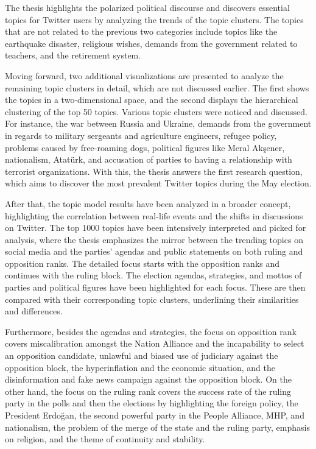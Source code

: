 The thesis highlights the polarized political discourse and discovers essential topics for Twitter 
users by analyzing the trends of the topic clusters. The topics that are not related to the previous 
two categories include topics like the earthquake disaster, religious wishes, demands from the 
government related to teachers, and the retirement system.

Moving forward, two additional visualizations are presented to analyze the remaining topic clusters 
in detail, which are not discussed earlier. The first shows the topics in a two-dimensional space, 
and the second displays the hierarchical clustering of the top 50 topics. Various topic clusters were 
noticed and discussed. For instance, the war between Russia and Ukraine, demands from the government 
in regards to military sergeants and agriculture engineers, refugee policy, problems caused by 
free-roaming dogs, political figures like Meral Akşener, nationalism, Atatürk, and accusation of 
parties to having a relationship with terrorist organizations. With this, the thesis answers the first 
research question, which aims to discover the most prevalent Twitter topics during the May election.

After that, the topic model results have been analyzed in a broader concept, highlighting the 
correlation between real-life events and the shifts in discussions on Twitter. The top 1000 topics 
have been intensively interpreted and picked for analysis, where the thesis emphasizes the mirror 
between the trending topics on social media and the parties' agendas and public statements on both 
ruling and opposition ranks. The detailed focus starts with the opposition ranks and continues with 
the ruling block. The election agendas, strategies, and mottos of parties and political figures have 
been highlighted for each focus. These are then compared with their corresponding topic clusters, 
underlining their similarities and differences. 

Furthermore, besides the agendas and strategies, the focus on opposition rank covers miscalibration 
amongst the Nation Alliance and the incapability to select an opposition candidate, unlawful and 
biased use of judiciary against the opposition block, the hyperinflation and the economic situation, 
and the disinformation and fake news campaign against the opposition block. On the other hand, the 
focus on the ruling rank covers the success rate of the ruling party in the polls and then the 
elections by highlighting the foreign policy, the President Erdoğan, the second powerful party in 
the People Alliance, \ac{MHP}, and nationalism,  the problem of the merge of the state and the ruling 
party, emphasis on religion, and the theme of continuity and stability.

